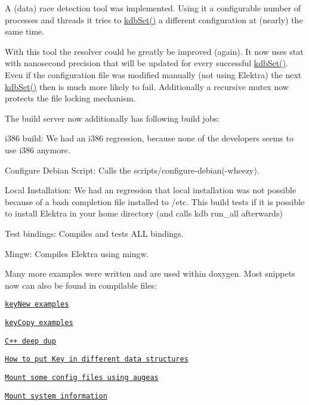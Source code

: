 A (data) race detection tool was implemented. Using it a configurable number of processes and threads it tries to \hyperlink{group__kdb_ga11436b058408f83d303ca5e996832bcf}{kdb\+Set()} a different configuration at (nearly) the same time.

With this tool the resolver could be greatly be improved (again). It now uses stat with nanosecond precision that will be updated for every successful \hyperlink{group__kdb_ga11436b058408f83d303ca5e996832bcf}{kdb\+Set()}. Even if the configuration file was modified manually (not using Elektra) the next \hyperlink{group__kdb_ga11436b058408f83d303ca5e996832bcf}{kdb\+Set()} then is much more likely to fail. Additionally a recursive mutex now protects the file locking mechanism.

The build server now additionally has following build jobs\+:


\begin{DoxyItemize}
\item i386 build\+: We had an i386 regression, because none of the developers seems to use i386 anymore.
\item Configure Debian Script\+: Calls the scripts/configure-\/debian(-\/wheezy).
\item Local Installation\+: We had an regression that local installation was not possible because of a bash completion file installed to /etc. This build tests if it is possible to install Elektra in your home directory (and calls kdb run\+\_\+all afterwards)
\item Test bindings\+: Compiles and tests A\+LL bindings.
\item Mingw\+: Compiles Elektra using mingw.
\end{DoxyItemize}

Many more examples were written and are used within doxygen. Most snippets now can also be found in compilable files\+:


\begin{DoxyItemize}
\item \href{https://github.com/ElektraInitiative/libelektra/tree/master/examples/keyNew.c}{\tt key\+New examples}
\item \href{https://github.com/ElektraInitiative/libelektra/tree/master/examples/keyCopy.c}{\tt key\+Copy examples}
\item \href{https://github.com/ElektraInitiative/libelektra/tree/master/src/bindings/cpp/examples/cpp_example_dup.cpp}{\tt C++ deep dup}
\item \href{https://github.com/ElektraInitiative/libelektra/tree/master/src/bindings/cpp/examples/cpp_example_ordering.cpp}{\tt How to put Key in different data structures}
\item \href{https://github.com/ElektraInitiative/libelektra/tree/master/scripts/kdb/mount-augeas}{\tt Mount some config files using augeas}
\item \href{https://github.com/ElektraInitiative/libelektra/tree/master/scripts/kdb/mount-info}{\tt Mount system information}
\end{DoxyItemize}

